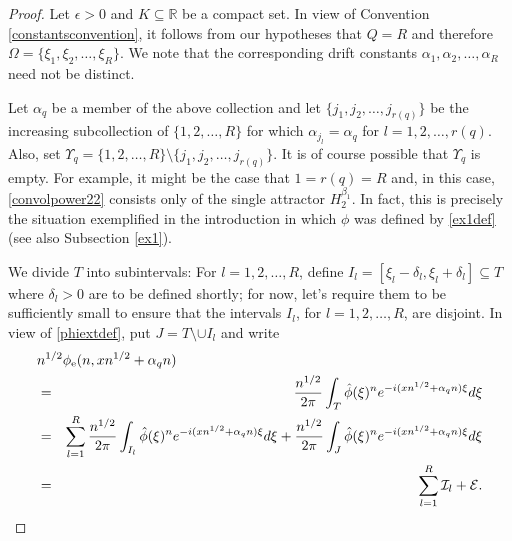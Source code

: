 \documentclass{article}
\theoremstyle{theorem}
\theoremstyle{remark}
\begin{document}
\begin{proof}

Let $\epsilon>0$ and $K\subseteq\mathbb{R}$ be a compact set. In view of Convention \ref{constantsconvention}, it follows from our hypotheses that $Q=R$ and therefore $\Omega=\{\xi_1,\xi_2,\dots,\xi_R\}$.  We note that the corresponding drift constants $\alpha_1,\alpha_2,\dots,\alpha_R$ need not be distinct.

Let $\alpha_q$ be a member of the above collection and let $\{j_1,j_2,\dots,j_{r(q)}\}$ be the increasing subcollection  of $\{1,2,\dots, R\}$ for which $\alpha_{j_l}=\alpha_q$ for $l=1,2,\dots, r(q)$. Also, set $\Upsilon_q=\{1,2,\dots,R\}\setminus\{j_1,j_2,\dots,j_{r(q)}\}$. It is of course possible that $\Upsilon_q$ is empty. For example, it might be the case that $1=r(q)=R$ and, in this case, \eqref{convolpower22} consists only of the single attractor $H_2^{\beta_1}$. In fact, this is precisely the situation exemplified in the introduction in which $\phi$ was defined by \eqref{ex1def} (see also Subsection \ref{ex1}). 


We divide $T$ into subintervals: For
$l=1,2,\dots,R$, define $I_l=[\xi_l-\delta_l,\xi_l+\delta_l]\subseteq T$ where $\delta_l>0$ are to be defined shortly; for now, let's require them to be sufficiently small to ensure that the intervals $I_l$, for $l=1,2,\dots,R$, are disjoint. In view of \eqref{phiextdef}, put $J=T\setminus\cup I_l$ and write
\begin{eqnarray}\label{split22}
\lefteqn{n^{1/2}\phi_{\mbox{\scriptsize{e}}}(n,xn^{1/2}+\alpha_q n)}\\
&=&\frac{n^{1/2}}{2\pi}\int_T
\hat{\phi}(\xi)^ne^{-i(xn^{1/2}+\alpha_q n)\xi}d\xi \nonumber\\
&=&\sum_{l=1}^{R}\frac{n^{1/2}}{2\pi}\int_{I_l}
\hat{\phi}(\xi)^ne^{-i(xn^{1/2}+\alpha_q n)\xi}d\xi \nonumber+\frac{n^{1/2}}{2\pi}\int_J \hat{\phi}(\xi)^ne^{-i(xn^{1/2}+\alpha_q
n)\xi}d\xi\nonumber\\
&=&\sum_{l=1}^{R}\mathcal{I}_l+\mathcal{E}.
\end{eqnarray}


\end{proof}
\end{document}
